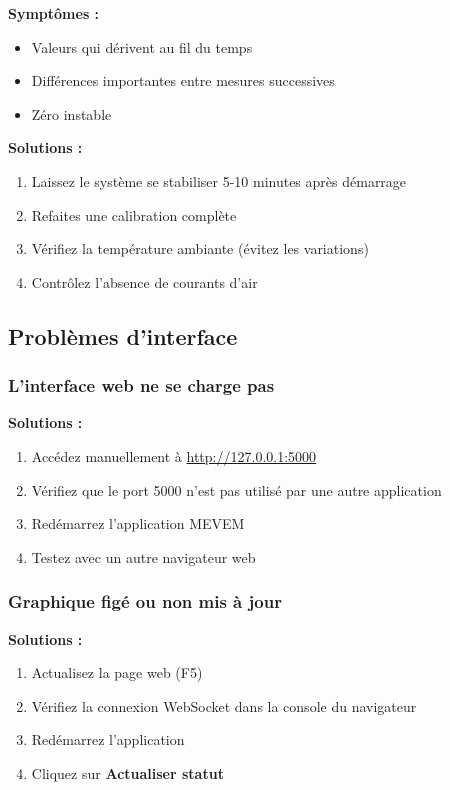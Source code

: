 \documentclass[12pt,a4paper]{article}
\begin{document}
\textbf{Symptômes :}
\begin{itemize}
    \item Valeurs qui dérivent au fil du temps
    \item Différences importantes entre mesures successives
    \item Zéro instable
\end{itemize}

\textbf{Solutions :}
\begin{enumerate}
    \item Laissez le système se stabiliser 5-10 minutes après démarrage
    \item Refaites une calibration complète
    \item Vérifiez la température ambiante (évitez les variations)
    \item Contrôlez l'absence de courants d'air
\end{enumerate}

\subsection{Problèmes d'interface}

\subsubsection{L'interface web ne se charge pas}

\textbf{Solutions :}
\begin{enumerate}
    \item Accédez manuellement à \url{http://127.0.0.1:5000}
    \item Vérifiez que le port 5000 n'est pas utilisé par une autre application
    \item Redémarrez l'application MEVEM
    \item Testez avec un autre navigateur web
\end{enumerate}

\subsubsection{Graphique figé ou non mis à jour}

\textbf{Solutions :}
\begin{enumerate}
    \item Actualisez la page web (F5)
    \item Vérifiez la connexion WebSocket dans la console du navigateur
    \item Redémarrez l'application
    \item Cliquez sur \textbf{Actualiser statut}
\end{enumerate}
\end{document}
